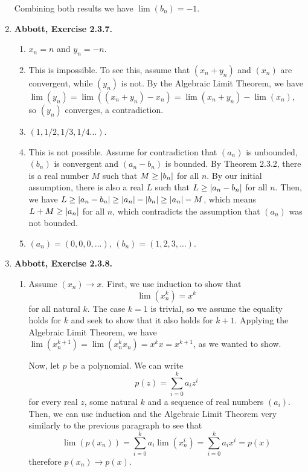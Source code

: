 \documentclass{article}
\DeclarePairedDelimiter\abs{\lvert}{\rvert}
\newcommand{\exc}[2][Abbott]{\item \textbf{#1, Exercise #2.}}
\begin{document}
\begin{enumerate}
	Combining both results we have $\lim(b_n) = -1$.
			        
	\exc{2.3.7}
	\begin{enumerate}
		\item $x_n = n$ and $y_n = -n$.
		      		      		                  
		\item This is impossible. To see this, assume that $(x_n+y_n)$ and $(x_n)$ are convergent, while $(y_n)$ is not. By the Algebraic Limit Theorem, we have $\lim(y_n)=\lim((x_n+y_n)-x_n) = \lim(x_n+y_n)-\lim(x_n)$, so $(y_n)$ converges, a contradiction.
		      		      		                  
		\item $(1, 1/2, 1/3, 1/4 \dots)$.
		      		      		                  
		\item This is not possible. Assume for contradiction that $(a_n)$ is unbounded, $(b_n)$ is convergent and $(a_n-b_n)$ is bounded. By Theorem 2.3.2, there is a real number $M$ such that $M \geq \abs{b_n}$ for all $n$. By our initial assumption, there is also a real $L$ such that $L \geq \abs{a_n-b_n}$ for all $n$. Then, we have $L \geq \abs{a_n-b_n} \geq \abs{a_n} - \abs{b_n} \geq \abs{a_n} - M$, which means $L+M \geq \abs{a_n}$ for all $n$, which contradicts the assumption that $(a_n)$ was not bounded.
		      		      		                  
		\item $(a_n) = (0,0,0, \dots)$, $(b_n) = (1,2,3, \dots)$.
	\end{enumerate}
			        
	\exc{2.3.8}
			    
	\begin{enumerate}
		\item Assume $(x_n) \rightarrow x$. First, we use induction to show that \begin{equation*}
		      \lim (x_n^k) = x ^ k
		\end{equation*}
		for all natural $k$. The case $k = 1$ is trivial, so we assume the equality holds for $k$ and seek to show that it also holds for $k+1$. Applying the Algebraic Limit Theorem, we have $\lim(x_n^{k+1}) = \lim(x_n^k x_n) = x^k x = x^{k+1}$, as we wanted to show.
						            
		Now, let $p$ be a polynomial. We can write \begin{equation*}
		p(z) = \sum\limits_{i=0}^k a_i z^i
		\end{equation*}
		for every real $z$, some natural $k$ and a sequence of real numbers $(a_i)$. Then, we can use induction and the Algebraic Limit Theorem very similarly to the previous paragraph to see that \begin{equation*}
		\lim (p(x_n)) = \sum\limits_{i=0}^k a_i \lim(x_n^i) =\sum\limits_{i=0}^k a_i x^i = p(x)
		\end{equation*}
		therefore $p(x_n) \rightarrow p(x)$.
						            

\end{enumerate}
\end{enumerate}
\end{document}
